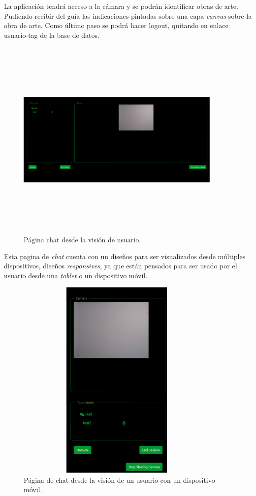 La aplicación tendrá acceso a la cámara y se podrán identificar obras de arte. Pudiendo recibir del guía las indicaciones pintadas sobre una capa \textit{canvas} sobre la obra de arte. Como último paso se podrá hacer logout, quitando en enlace usuario-tag de la base de datos.
\FloatBarrier
\begin{figure}[h]
    \centering
    \includegraphics[width=10cm,height=10cm,keepaspectratio]{img/UserChatDesktop.png}
    \caption{Página chat desde la visión de usuario.}
    \label{fig:Página chat desde la visión de usuario}
\end{figure}
\FloatBarrier

Esta pagina de \textit{chat} cuenta con un diseños para ser visualizados desde múltiples dispositivos, diseños \textit{responsives}, ya que están pensados para ser usado por el usuario desde una \textit{tablet} o un dispositivo móvil.
\FloatBarrier
\begin{figure}[h]
    \centering
    \includegraphics[width=10cm,height=10cm,keepaspectratio]{img/UserChatMobile.png}
    \caption{Página de chat desde la visión de un usuario con un dispositivo móvil.}
    \label{fig:diagram_seceunce_guide}
\end{figure}
\FloatBarrier
